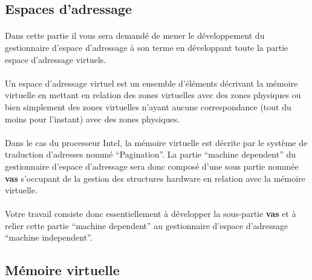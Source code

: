 \documentclass[10pt,a4wide]{article}
\begin{document}
\paragraph{}

\subsection{Espaces d'adressage}

\paragraph{}

Dans cette partie il vous sera demand\'e de mener le d\'eveloppement du
gestionnaire d'espace d'adressage \`a son terme en d\'eveloppant toute la
partie espace d'adressage virtuels.

\paragraph{}

Un espace d'adressage virtuel est un ensemble d'\'el\'ements d\'ecrivant
la m\'emoire virtuelle en mettant en relation des zones virtuelles avec des
zones physiques ou bien simplement des zones virtuelles n'ayant aucune
correspondance (tout du moins pour l'instant) avec des zones physiques.

\paragraph{}

Dans le cas du processeur Intel, la m\'emoire virtuelle est d\'ecrite
par le syst\`eme de traduction d'adresses nomm\'e ``Pagination''. La
partie ``machine dependent'' du gestionnaire d'espace d'adressage sera
donc compos\'e d'une sous partie nomm\'ee \textbf{vas} s'occupant de la
gestion des structures hardware en relation avec la m\'emoire virtuelle.

\paragraph{}

Votre travail consiste donc essentiellement \`a d\'evelopper la sous-partie
\textbf{vas} et \`a relier cette partie ``machine dependent'' au gestionnaire
d'espace d'adressage ``machine independent''.

\subsection{M\'emoire virtuelle}
\end{document}
